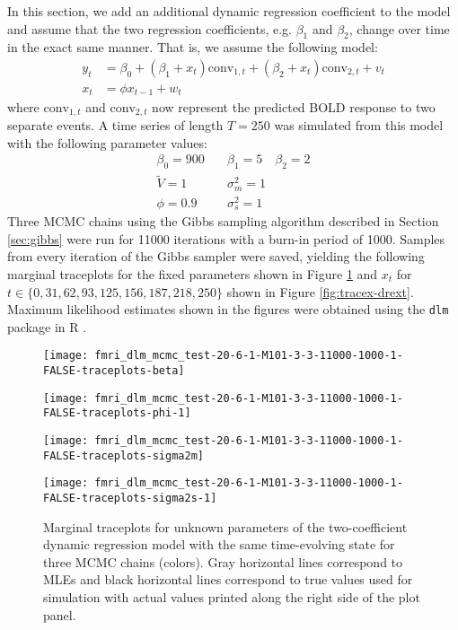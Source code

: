 \documentclass{article}
\begin{document}
In this section, we add an additional dynamic regression coefficient to the model and assume that the two regression coefficients, e.g. $\beta_1$ and $\beta_2$, change over time in the exact same manner. That is, we assume the following model:
\begin{align*}
y_t &= \beta_0 + (\beta_1 + x_t)\mbox{conv}_{1,t} + (\beta_2 + x_t)\mbox{conv}_{2,t} + v_t \\
x_t &= \phi x_{t-1} + w_t
\end{align*}
\noindent where $\mbox{conv}_{1,t}$ and $\mbox{conv}_{2,t}$ now represent the predicted BOLD response to two separate events. A time series of length $T = 250$ was simulated from this model with the following parameter values:
\begin{align*}
\beta_0 = 900 &\quad \beta_1 = 5 \quad \beta_2 = 2 \\
\tilde{V} = 1 &\quad \sigma_m^2 = 1 \\
\phi = 0.9 &\quad \sigma_s^2 = 1
\end{align*}
Three MCMC chains using the Gibbs sampling algorithm described in Section \ref{sec:gibbs} were run for 11000 iterations with a burn-in period of 1000. Samples from every iteration of the Gibbs sampler were saved, yielding the following marginal traceplots for the fixed parameters shown in Figure \ref{fig:tracetheta-drext} and $x_t$ for $t \in \{0, 31, 62, 93, 125, 156, 187, 218, 250\}$ shown in Figure \ref{fig:tracex-drext}. Maximum likelihood estimates shown in the figures were obtained using the {\tt dlm} package in R \citep{petris2009dynamic}.

\begin{figure}[ht]
\begin{minipage}{0.5\linewidth}
\texttt{[image: fmri\_dlm\_mcmc\_test-20-6-1-M101-3-3-11000-1000-1-FALSE-traceplots-beta]}
\end{minipage}
\begin{minipage}{0.5\linewidth}
\texttt{[image: fmri\_dlm\_mcmc\_test-20-6-1-M101-3-3-11000-1000-1-FALSE-traceplots-phi-1]}
\end{minipage}
\begin{minipage}{0.5\linewidth}
\texttt{[image: fmri\_dlm\_mcmc\_test-20-6-1-M101-3-3-11000-1000-1-FALSE-traceplots-sigma2m]}
\end{minipage}
\begin{minipage}{0.5\linewidth}
\texttt{[image: fmri\_dlm\_mcmc\_test-20-6-1-M101-3-3-11000-1000-1-FALSE-traceplots-sigma2s-1]}
\end{minipage}
\caption{Marginal traceplots for unknown parameters of the two-coefficient dynamic regression model with the same time-evolving state for three MCMC chains (colors). Gray horizontal lines correspond to MLEs and black horizontal lines correspond to true values used for simulation with actual values printed along the right side of the plot panel.} \label{fig:tracetheta-drext}
\end{figure}
\end{document}
